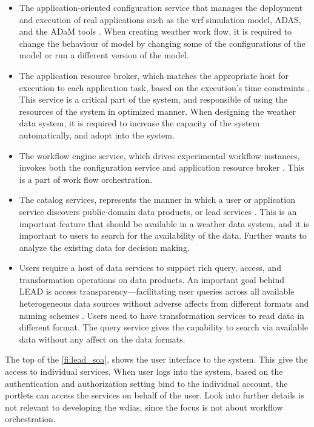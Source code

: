 \begin{itemize}
\item The application-oriented configuration service that manages the deployment and execution of real applications such as the \acrshort{wrf} simulation model, ADAS, and the ADaM tools \cite{Droegemeier2005Service-OrientedWeather}. When creating weather work flow, it is required to change the behaviour of model by changing some of the configurations of the model or run a different version of the model.
\item The application resource broker, which matches the appropriate host for execution to each application task, based on the execution’s time constraints \cite{Droegemeier2005Service-OrientedWeather}. This service is a critical part of the system, and responsible of using the resources of the system in optimized manner. When designing the weather data system, it is required to increase the capacity of the system automatically, and adopt into the system.
\item The workflow engine service, which drives experimental workflow instances, invokes both the configuration service and application resource broker \cite{Droegemeier2005Service-OrientedWeather}. This is a part of work flow orchestration.
\item The catalog services, represents the manner in which a user or application service discovers public-domain data products, or \acrshort{lead} services \cite{Droegemeier2005Service-OrientedWeather}. This is an important feature that should be available in a weather data system, and it is important to users to search for the availability of the data. Further wants to analyze the existing data for decision making.
\item Users require a host of data services to support rich query, access, and transformation operations on data products. An important goal behind LEAD is access transparency—facilitating user queries across all available heterogeneous data sources without adverse affects from different formats and naming schemes \cite{Droegemeier2005Service-OrientedWeather}. Users need to have transformation services to read data in different format. The query service gives the capability to search via available data without any affect on the data formats.
\end{itemize}
The top of the \cref{fi:lead_soa}, shows the user interface to the system. This give the access to individual services. When user logs into the system, based on the authentication and authorization setting bind to the individual account, the portlets can access the services on behalf of the user. Look into further details is not relevant to developing the \acrshort{wdias}, since the focus is not about workflow orchestration.

